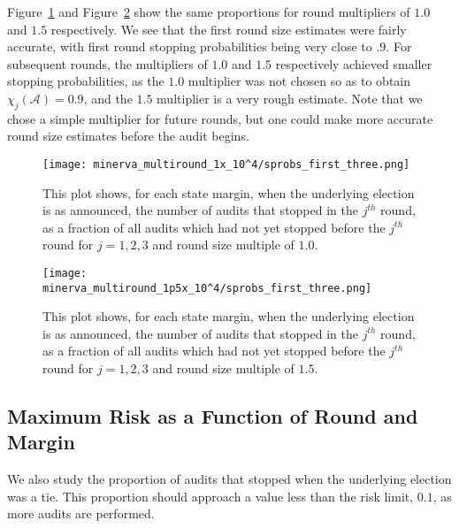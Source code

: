 Figure~\ref{fig:minerva1_sprob} and Figure~\ref{fig:minerva1p5_sprob} show the same proportions for \Minerva round multipliers of $1.0$ and $1.5$ respectively. We see that the first round size estimates were fairly accurate, with first round stopping probabilities being very close to $.9$. For subsequent rounds, the multipliers of $1.0$ and $1.5$ respectively achieved smaller stopping probabilities, as the $1.0$ multiplier was not chosen so as to obtain $\chi_j({\mathcal A}) = 0.9$, and the $1.5$ multiplier is a very rough estimate. Note that we chose a simple multiplier for future rounds, but one could make more accurate round size estimates before the audit begins. 

\begin{figure}
\begin{centering}
\texttt{[image: minerva\_multiround\_1x\_10^4/sprobs\_first\_three.png]}
\caption{This plot shows, for each state margin, when the underlying election is as announced, the number of \Minerva audits that stopped in the $j^{th}$ round,
as a fraction of all \Minerva audits which had not yet stopped before the $j^{th}$ round for $j=1,2,3$ and round size multiple of $1.0$.}
\label{fig:minerva1_sprob}
\end{centering}
\end{figure}

\begin{figure}
\begin{centering}
\texttt{[image: minerva\_multiround\_1p5x\_10^4/sprobs\_first\_three.png]}
\caption{This plot shows, for each state margin, when the underlying election is as announced, the number of \Minerva audits that stopped in the $j^{th}$ round,
as a fraction of all \Minerva audits which had not yet stopped before the $j^{th}$ round for $j=1,2,3$ and round size multiple of $1.5$.}
\label{fig:minerva1p5_sprob}
\end{centering}
\end{figure}

\subsection{Maximum Risk as a Function of Round and Margin}
We also study the proportion of audits that stopped when the underlying election was a tie.
This proportion should approach a value less than the risk limit, $0.1$, as more audits are performed.


